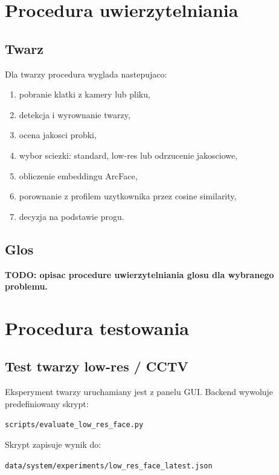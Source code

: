 \documentclass[12pt]{article}
\begin{document}
\section{Procedura uwierzytelniania}

\subsection{Twarz}

Dla twarzy procedura wyglada nastepujaco:

\begin{enumerate}
    \item pobranie klatki z kamery lub pliku,
    \item detekcja i wyrownanie twarzy,
    \item ocena jakosci probki,
    \item wybor sciezki: standard, low-res lub odrzucenie jakosciowe,
    \item obliczenie embeddingu ArcFace,
    \item porownanie z profilem uzytkownika przez cosine similarity,
    \item decyzja na podstawie progu.
\end{enumerate}

\subsection{Glos}

\textbf{TODO: opisac procedure uwierzytelniania glosu dla wybranego problemu.}

\section{Procedura testowania}

\subsection{Test twarzy low-res / CCTV}

Eksperyment twarzy uruchamiany jest z panelu GUI. Backend wywoluje predefiniowany skrypt:

\begin{center}
\texttt{scripts/evaluate\_low\_res\_face.py}
\end{center}

Skrypt zapisuje wynik do:

\begin{center}
\texttt{data/system/experiments/low\_res\_face\_latest.json}
\end{center}
\end{document}
